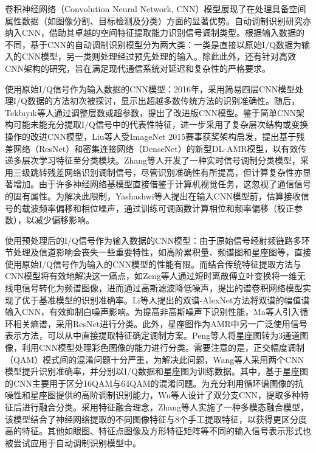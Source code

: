卷积神经网络（Convolution Neural Network, CNN）模型展现了在处理具备空间属性数据（如图像分割、目标检测及分类）方面的显著优势。自动调制识别研究亦纳入CNN，借助其卓越的空间特征提取能力识别信号调制类型。根据输入数据的不同，基于CNN的自动调制识别模型分为两大类：一类是直接以原始I/Q数据为输入的CNN模型，另一类则处理经过预先处理的输入。除此此外，还有针对高效CNN架构的研究，旨在满足现代通信系统对延迟和复杂性的严格要求。

使用原始I/Q信号作为输入数据的CNN模型：2016年，采用简易四层CNN模型处理I/Q数据的方法初次被探讨，显示出超越多数传统方法的识别准确性\cite{o2016convolutional}。随后，Tekbıyık等人通过调整层数或超参数，提出了改进版CNN模型\cite{tekbiyik2020robust}。鉴于简单CNN架构可能未能充分提取I/Q信号中的代表性特征，进一步采用了复杂层次结构或变换操作的改进CNN模型，Liu等人受ImageNet 2015赛事获奖架构启发，提出基于残差网络（ResNet）和密集连接网络（DenseNet）的新型DL-AMR模型，以有效传递多层次学习特征至分类模块\cite{liu2017deep}。Zhang等人开发了一种实时信号调制分类模型，采用三级跳转残差网络识别调制信号，尽管识别准确性有所提高，但计算复杂性亦显著增加\cite{zhang2021real}。由于许多神经网络基模型直接借鉴于计算机视觉任务，这忽视了通信信号的固有属性。为解决此限制，Yashashwi等人提出在输入CNN模型前，估算接收信号的载波频率偏移和相位噪声，通过训练可调函数计算相位和频率偏移（校正参数），以减少偏移影响\cite{yashashwi2018learnable}。

使用预处理后的I/Q信号作为输入数据的CNN模型：由于原始信号经射频链路多环节处理及信道影响会丧失一些重要特性，如高阶累积量、频谱图和星座图等，直接使用原始I/Q信号作为输入的CNN模型的性能有限。而结合传统特征提取方法与CNN模型将有效地解决这一痛点，如Zeng等人通过短时离散傅立叶变换将一维无线电信号转化为频谱图像，进而通过高斯滤波降低噪声，提出的谱卷积网络模型实现了优于基准模型的识别准确率\cite{zeng2019spectrum}。Li等人提出的双谱-AlexNet方法将双谱的幅值谱输入CNN，有效抑制白噪声影响\cite{li2019automatic}。为提高非高斯噪声下识别性能，Ma等人引入循环相关熵谱，采用ResNet进行分类\cite{ma2019automatic}。此外，星座图作为AMR中另一广泛使用信号表示方法，可以从中直接提取特征确定调制方案。Peng等人将星座图转为3通道图像\cite{peng2018modulation}，利用CNN模型处理彩色图像的能力进行分类。需要注意的是，正交幅度调制（QAM）模式间的混淆问题十分严重，为解决此问题，Wang等人采用两个CNN模型提升识别准确率，并分别以I/Q数据和星座图为训练数据\cite{wang2019data}。其中，基于星座图的CNN主要用于区分16QAM与64QAM的混淆问题。为充分利用循环谱图像的抗噪性和星座图提供的高阶调制识别能力，Wu等人设计了双分支CNN，提取多种特征后进行融合分类\cite{wu2019convolutional}。采用特征融合理念，Zhang等人实施了一种多模态融合模型，该模型结合了神经网络提取的不同图像特征与8个手工提取特征，以获得更区分度高的特征\cite{zhang2019automatic}。其他如眼图\cite{wang2017modulation}、特征点图像\cite{lee2019feature}及方形特征矩阵\cite{chen2021signet}等不同的输入信号表示形式也被尝试应用于自动调制识别模型中。

